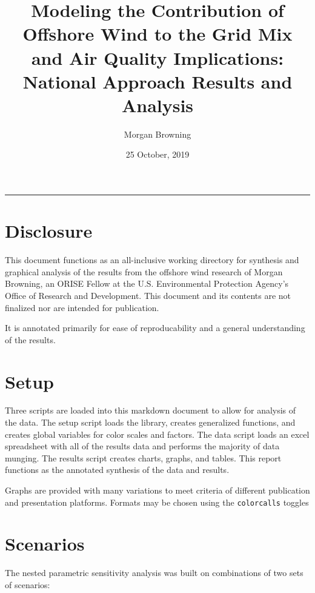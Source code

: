 \documentclass[]{article}
\title{Modeling the Contribution of Offshore Wind to the Grid Mix and Air
Quality Implications: National Approach Results and Analysis}
\author{Morgan Browning}
\date{25 October, 2019}
\begin{document}
\maketitle

{
\setcounter{tocdepth}{2}
\tableofcontents
}
\begin{center}\rule{0.5\linewidth}{\linethickness}\end{center}

\hypertarget{disclosure}{%
\section{Disclosure}\label{disclosure}}

This document functions as an all-inclusive working directory for
synthesis and graphical analysis of the results from the offshore wind
research of Morgan Browning, an ORISE Fellow at the U.S. Environmental
Protection Agency's Office of Research and Development. This document
and its contents are not finalized nor are intended for publication.

It is annotated primarily for ease of reproducability and a general
understanding of the results.

\hypertarget{setup}{%
\section{Setup}\label{setup}}

Three scripts are loaded into this markdown document to allow for
analysis of the data. The setup script loads the library, creates
generalized functions, and creates global variables for color scales and
factors. The data script loads an excel spreadsheet with all of the
results data and performs the majority of data munging. The results
script creates charts, graphs, and tables. This report functions as the
annotated synthesis of the data and results.

Graphs are provided with many variations to meet criteria of different
publication and presentation platforms. Formats may be chosen using the
\texttt{colorcalls} toggles

\hypertarget{scenarios}{%
\section{Scenarios}\label{scenarios}}

The nested parametric sensitivity analysis was built on combinations of
two sets of scenarios:
\end{document}
